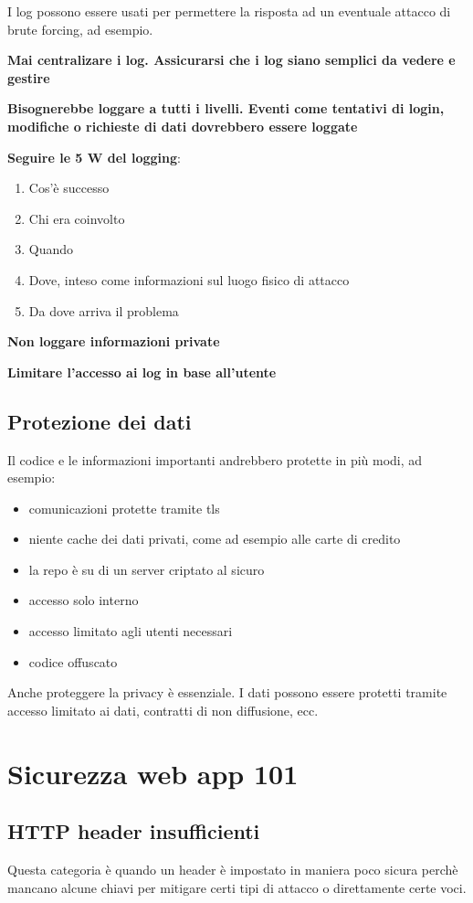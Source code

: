 \documentclass[11pt,a4paper]{book}
\begin{document}
I log possono essere usati per permettere la risposta ad un eventuale attacco di brute forcing, ad esempio.

\textbf{Mai centralizare i log. Assicurarsi che i log siano semplici da vedere e gestire}

\textbf{Bisognerebbe loggare a tutti i livelli. Eventi come tentativi di login, modifiche o richieste di dati dovrebbero essere loggate}

\textbf{Seguire le 5 W del logging}:
\begin{enumerate}
	\item Cos'è successo
	\item Chi era coinvolto
	\item Quando
	\item Dove, inteso come informazioni sul luogo fisico di attacco
	\item Da dove arriva il problema
\end{enumerate}

\textbf{Non loggare informazioni private}

\textbf{Limitare l'accesso ai log in base all'utente}

\section{Protezione dei dati}
Il codice e le informazioni importanti andrebbero protette in più modi, ad esempio:
\begin{itemize}
	\item comunicazioni protette tramite tls
	\item niente cache dei dati privati, come ad esempio alle carte di credito
	\item la repo è su di un server criptato al sicuro
	\item accesso solo interno
	\item accesso limitato agli utenti necessari
	\item codice offuscato
\end{itemize}

Anche proteggere la privacy è essenziale. I dati possono essere protetti tramite accesso limitato ai dati, contratti di non diffusione, ecc.

\chapter{Sicurezza web app 101}
\section{HTTP header insufficienti}
Questa categoria è quando un header è impostato in maniera poco sicura perchè mancano alcune chiavi per mitigare certi tipi di attacco o direttamente certe voci.
\end{document}
